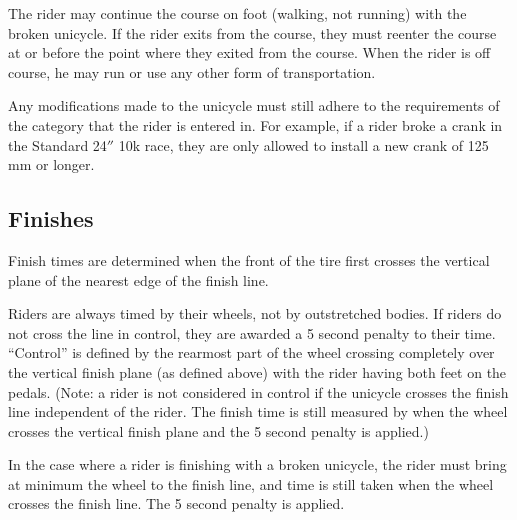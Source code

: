 The rider may continue the course on foot (walking, not running) with the broken unicycle.
If the rider exits from the course, they must reenter the course at or before the point where they exited from the course.
When the rider is off course, he may run or use any other form of transportation.

Any modifications made to the unicycle must still adhere to the requirements of the category that the rider is entered in.
For example, if a rider broke a crank in the Standard 24$''$ 10k race, they are only allowed to install a new crank of 125 mm or longer.


\subsection{Finishes}

Finish times are determined when the front of the tire first crosses the vertical plane of the nearest edge of the finish line. 

Riders are always timed by their wheels, not by outstretched bodies.
If riders do not cross the line in control, they are awarded a 5 second penalty to their time.
``Control'' is defined by the rearmost part of the wheel crossing completely over the vertical finish plane (as defined above) with the rider having both feet on the pedals.
(Note: a rider is not considered in control if the unicycle crosses the finish line independent of the rider.
The finish time is still measured by when the wheel crosses the vertical finish plane and the 5 second penalty is applied.)

In the case where a rider is finishing with a broken unicycle, the rider must bring at minimum the wheel to the finish line, and time is still taken when the wheel crosses the finish line.
The 5 second penalty is applied.
